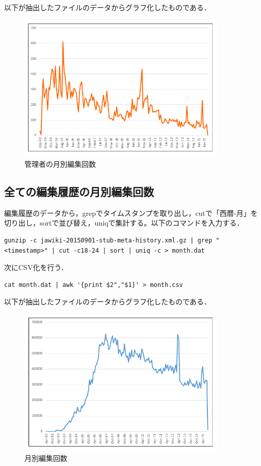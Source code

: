 以下が抽出したファイルのデータからグラフ化したものである．

\begin{figure}[H]
\centering
\includegraphics[width=10cm]{sysop_month.png}
\caption{管理者の月別編集回数}\label{サンプル図}
\end{figure}



\subsection{全ての編集履歴の月別編集回数}

編集履歴のデータから，grepでタイムスタンプを取り出し，cutで「西暦-月」を切り出し，sortで並び替え，uniqで集計する。以下のコマンドを入力する．

{\small
\begin{verbatim}
gunzip -c jawiki-20150901-stub-meta-history.xml.gz | grep "<timestamp>" | cut -c18-24 | sort | uniq -c > month.dat
\end{verbatim}}

次にCSV化を行う．

{\small
\begin{verbatim}
cat month.dat | awk '{print $2","$1}' > month.csv
\end{verbatim}}

\clearpage

以下が抽出したファイルのデータからグラフ化したものである．

\begin{figure}[H]
\centering
\includegraphics[width=10cm]{month1.png}
\caption{月別編集回数}\label{サンプル図}
\end{figure}


